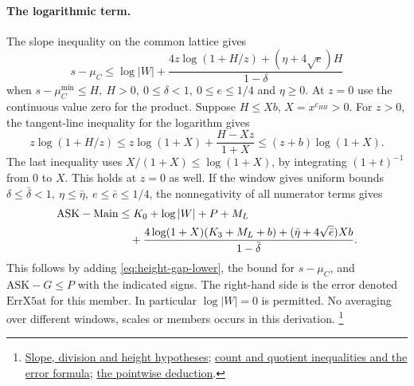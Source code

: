 \paragraph{The logarithmic term.}
The slope inequality on the common lattice gives
\[
 s-\mu_C\le\log |W|+
 \frac{4z\log(1+H/z)+(\eta+4\sqrt e)H}{1-\delta}
\]
when \(s-\mu_C^{\min}\le H,\ H>0,\ 0\le\delta<1,\ 0\le e\le1/4\)
and \(\eta\ge0\). At \(z=0\) use the continuous value zero for the
product. Suppose \(H\le Xb\), \(X=x^{c_{HH}}>0\).
For \(z>0\), the tangent-line inequality for the logarithm gives
\[
 z\log(1+H/z)
 \le z\log(1+X)+\frac{H-Xz}{1+X}
 \le (z+b)\log(1+X).
\]
The last inequality uses \(X/(1+X)\le\log(1+X)\), by integrating
\((1+t)^{-1}\) from \(0\) to \(X\). This holds at \(z=0\) as well.
If the window gives uniform bounds
\(\delta\le\bar\delta<1,\ \eta\le\bar\eta,\ e\le\bar e\le1/4\),
the nonnegativity of all numerator terms gives
\begin{align}
 \mathrm{ASK}-\mathrm{Main}
  &\le K_0+\log|W|+P+M_L \notag\\
  &\quad+
    \frac{4\log(1+X)(K_3+M_L+b)
                     +(\bar\eta+4\sqrt{\bar e})Xb}{1-\bar\delta}.
    \label{eq:unit-gap}
\end{align}
This follows by adding \eqref{eq:height-gap-lower},
the bound for \(s-\mu_C\), and \(\mathrm{ASK}-G\le P\) with the
indicated signs. The right-hand side is the error denoted
\(\mathrm{ErrX5at}\) for this member. In particular \(\log|W|=0\)
is permitted. No averaging over different windows, scales or
members occurs in this derivation.
\footnote{\href{https://github.com/Deicyde/riemann-hypothesis/blob/40e56bab/src/Formalism/RankGapBounds/MeanBoundSecondForm.lean}{Slope, division and height hypotheses};
\href{https://github.com/Deicyde/riemann-hypothesis/blob/40e56bab/src/Formalism/SizeWindowBrackets/QuotientSlopeBoundsWith.lean}{count and quotient inequalities and the error formula};
\href{https://github.com/Deicyde/riemann-hypothesis/blob/40e56bab/src/Formalism/SizeWindowBrackets/ChainSlopeWindows/LevelOfCongruence.lean}{the pointwise deduction}.}
